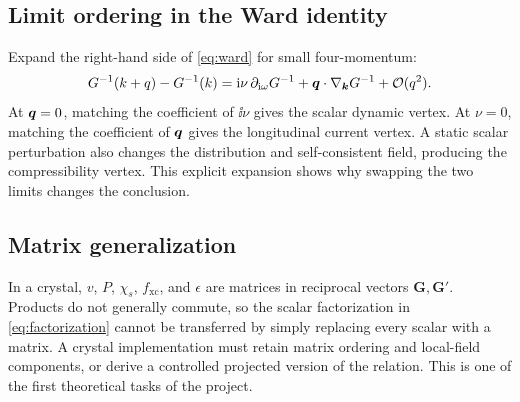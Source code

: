 \subsection{Limit ordering in the Ward identity}

Expand the right-hand side of \cref{eq:ward} for small four-momentum:
\begin{equation}
  G^{-1}(k+q)-G^{-1}(k)
  =\mathrm{i}\nu\,\partial_{\mathrm{i}\omega}G^{-1}
   +\bm{q}\cdot\nabla_{\bm{k}}G^{-1}+\mathcal{O}(q^2).
\end{equation}
At $\bm{q}=0$, matching the coefficient of $\ii\nu$ gives the scalar dynamic
vertex.  At $\nu=0$, matching the coefficient of $\bm{q}$ gives the longitudinal
current vertex.  A static scalar perturbation also changes the distribution and
self-consistent field, producing the compressibility vertex.  This explicit
expansion shows why swapping the two limits changes the conclusion.

\subsection{Matrix generalization}

In a crystal, $v$, $P$, $\chi_s$, $f_{\mathrm{xc}}$, and $\epsilon$ are matrices
in reciprocal vectors $\bm G,\bm G'$.  Products do not generally commute, so the
scalar factorization in \cref{eq:factorization} cannot be transferred by simply
replacing every scalar with a matrix.  A crystal implementation must retain
matrix ordering and local-field components, or derive a controlled projected
version of the relation.  This is one of the first theoretical tasks of the
project.
